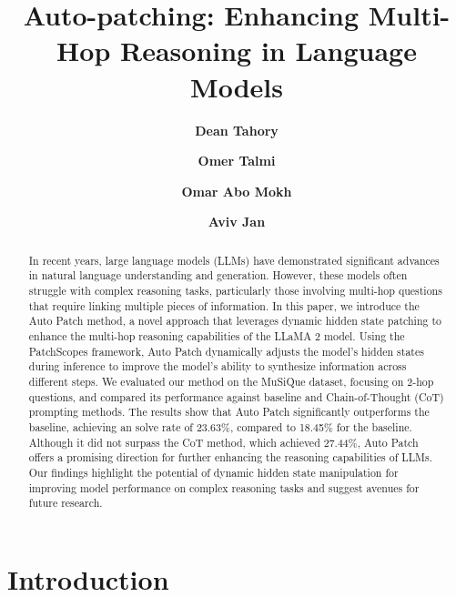 \documentclass[11pt]{article}
\title{Auto-patching: Enhancing Multi-Hop Reasoning in Language Models}
\author{\textbf{Dean Tahory}}
\author{\textbf{\;Omer Talmi}}
\author{\textbf{\;Omar Abo Mokh}}
\author{\textbf{\;Aviv Jan}}
\affil{Tel Aviv University}
\affil{\tt\small \{deantahory, omertalmi, omarabomokh, avivjan\}@mail.tau.ac.il}
\begin{document}
\maketitle

\begin{abstract}

    In recent years, large language models (LLMs) have demonstrated significant advances in natural language understanding and generation. However, these models often struggle with complex reasoning tasks, particularly those involving multi-hop questions that require linking multiple pieces of information. In this paper, we introduce the Auto Patch method, a novel approach that leverages dynamic hidden state patching to enhance the multi-hop reasoning capabilities of the LLaMA 2 model. Using the PatchScopes framework, Auto Patch dynamically adjusts the model's hidden states during inference to improve the model's ability to synthesize information across different steps. We evaluated our method on the MuSiQue dataset, focusing on 2-hop questions, and compared its performance against baseline and Chain-of-Thought (CoT) prompting methods. The results show that Auto Patch significantly outperforms the baseline, achieving an solve rate of 23.63\%, compared to 18.45\% for the baseline. Although it did not surpass the CoT method, which achieved 27.44\%, Auto Patch offers a promising direction for further enhancing the reasoning capabilities of LLMs. Our findings highlight the potential of dynamic hidden state manipulation for improving model performance on complex reasoning tasks and suggest avenues for future research.
    
\end{abstract}



\section{Introduction}
\end{document}
